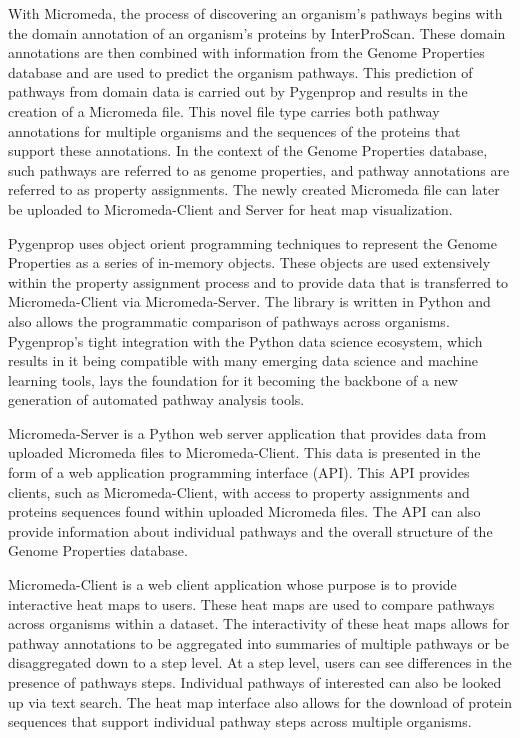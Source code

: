 With Micromeda, the process of discovering an organism's pathways begins with the domain annotation of an organism's proteins by InterProScan. These domain annotations are then combined with information from the Genome Properties database and are used to predict the organism pathways. This prediction of pathways from domain data is carried out by Pygenprop and results in the creation of a Micromeda file. This novel file type carries both pathway annotations for multiple organisms and the sequences of the proteins that support these annotations. In the context of the Genome Properties database, such pathways are referred to as genome properties, and pathway annotations are referred to as property assignments. The newly created Micromeda file can later be uploaded to Micromeda-Client and Server for heat map visualization.

Pygenprop uses object orient programming techniques to represent the Genome Properties as a series of in-memory objects. These objects are used extensively within the property assignment process and to provide data that is transferred to Micromeda-Client via Micromeda-Server. The library is written in Python and also allows the programmatic comparison of pathways across organisms. Pygenprop's tight integration with the Python data science ecosystem, which results in it being compatible with many emerging data science and machine learning tools, lays the foundation for it becoming the backbone of a new generation of automated pathway analysis tools.

Micromeda-Server is a Python web server application that provides data from uploaded Micromeda files to Micromeda-Client. This data is presented in the form of a web application programming interface (API). This API provides clients, such as Micromeda-Client, with access to property assignments and proteins sequences found within uploaded Micromeda files. The API can also provide information about individual pathways and the overall structure of the Genome Properties database.

Micromeda-Client is a web client application whose purpose is to provide interactive heat maps to users. These heat maps are used to compare pathways across organisms within a dataset. The interactivity of these heat maps allows for pathway annotations to be aggregated into summaries of multiple pathways or be disaggregated down to a step level. At a step level, users can see differences in the presence of pathways steps. Individual pathways of interested can also be looked up via text search. The heat map interface also allows for the download of protein sequences that support individual pathway steps across multiple organisms.

